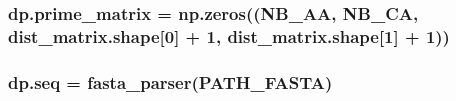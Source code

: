 \subsubsection[{\texorpdfstring{prime\+\_\+matrix}{prime_matrix}}]{\setlength{\rightskip}{0pt plus 5cm}dp.\+prime\+\_\+matrix = np.\+zeros(({\bf N\+B\+\_\+\+AA}, {\bf N\+B\+\_\+\+CA}, dist\+\_\+matrix.\+shape\mbox{[}0\mbox{]} + 1, dist\+\_\+matrix.\+shape\mbox{[}1\mbox{]} + 1))}\hypertarget{namespacedp_a86f19141b28dd3816fa7a075f64c0631}{}\label{namespacedp_a86f19141b28dd3816fa7a075f64c0631}
\subsubsection[{\texorpdfstring{seq}{seq}}]{\setlength{\rightskip}{0pt plus 5cm}dp.\+seq = {\bf fasta\+\_\+parser}({\bf P\+A\+T\+H\+\_\+\+F\+A\+S\+TA})}\hypertarget{namespacedp_a60635934dcb82b1c274e6cceab216700}{}\label{namespacedp_a60635934dcb82b1c274e6cceab216700}
